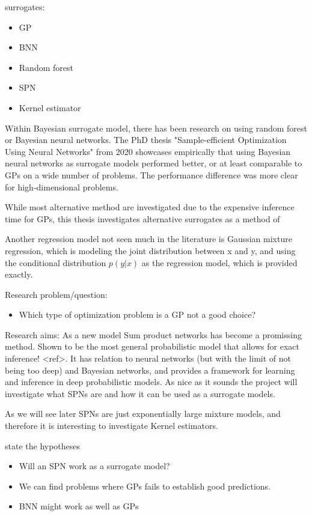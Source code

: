 surrogates: 
\begin{itemize}
    \item GP
    \item BNN
    \item Random forest
    \item SPN
    \item Kernel estimator
\end{itemize}

Within Bayesian surrogate model, there has been research on using random forest or Bayesian neural 
networks. The PhD thesis "Sample-efficient Optimization Using Neural Networks" from 2020 \cite{PhDthesis}
showcases empirically that using Bayesian neural networks as surrogate models performed better,
or at least comparable to GPs on a wide number of problems. The performance difference was more
clear for high-dimensional problems. 

While most alternative method are investigated due to the expensive inference time for GPs, 
this thesis investigates alternative surrogates as a method of 

Another regression model not seen much in the literature is Gaussian mixture regression, which
is modeling the joint distribution between x and y, and using the conditional distribution $p(y|x)$
as the regression model, which is provided exactly. 

Research problem/question:
\begin{itemize}
    \item Which type of optimization problem is a GP not a good choice?
\end{itemize}

Research aims:
As a new model Sum product networks has become a promissing method. Shown to be the most 
general probabilistic model that allows for exact inference! <ref>. It has relation to 
neural networks (but with the limit of not being too deep) and Bayesian networks, and provides
a framework for learning and inference in deep probabilistic models. As nice as it sounds
the project will investigate what SPNs are and how it can be used as a surrogate models. 

As we will see later SPNs are just exponentially large mixture models, and therefore 
it is interesting to investigate Kernel estimators.

state the hypotheses
\begin{itemize}
    \item Will an SPN work as a surrogate model?
    \item We can find problems where GPs fails to establish good predictions. 
    \item BNN might work as well as GPs
\end{itemize}

